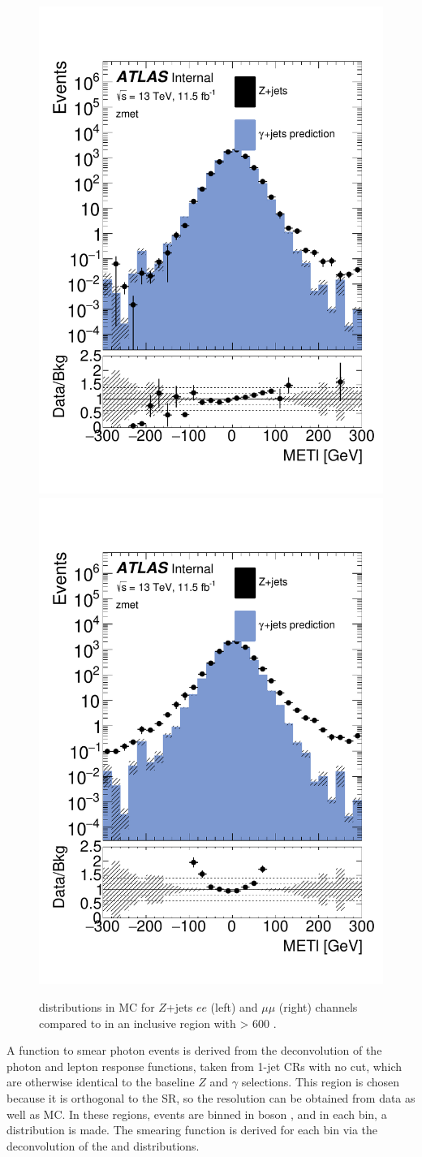 \begin{centering}
\begin{figure}[!hbt]
\myfloatalign
\includegraphics[width=.45\linewidth]{figures/photons/MC_hist_METl_Pt_0_ee_2j_2016_mcmetl_ptrw__zmet_.pdf}
\includegraphics[width=.45\linewidth]{figures/photons/MC_hist_METl_Pt_0_mm_2j_2016_mcmetl_ptrw__zmet_.pdf}
\caption{\metl distributions in \ac{MC} for $Z$+jets $ee$ (left) and $\mu\mu$ (right) channels compared to \gjets in an inclusive region with \HT > 600 \gev.}
\label{fig:photon_metparallel}
\end{figure}
\end{centering}

A function to smear photon events is derived from the deconvolution of the photon and lepton response functions, taken from 1-jet \acp{CR} with no \HT cut, which are otherwise identical to the baseline $Z$ and $\gamma$ selections. This region is chosen because it is orthogonal to the \ac{SR}, so the resolution can be obtained from data as well as \ac{MC}. In these regions, events are binned in boson \pt, and in each bin, a \metl distribution is made. The smearing function is derived for each bin via the deconvolution of the \dyjets and \gjets distributions. 

